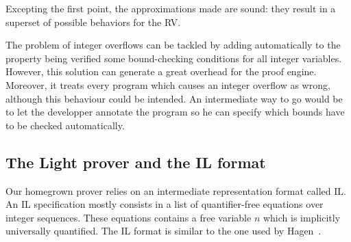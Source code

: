 Excepting the first point, the approximations made are sound: they result in a superset of possible behaviors for the RV. %

The problem of integer overflows can be tackled by adding automatically to the property being verified some bound-checking conditions for all integer variables. However, this solution can generate a great overhead for the proof engine. Moreover, it treats every program which causes an integer overflow as wrong, although this behaviour could be intended. An intermediate way to go would be to let the developper annotate the program so he can specify which bounds have to be checked automatically.

%




\subsection{The Light prover and the IL format} 

Our homegrown prover relies on an intermediate representation format called
{IL}. An IL specification mostly consists in a list of quantifier-free equations
over integer sequences. These equations contains a free variable $n$ which is
implicitly universally quantified. The IL format is similar to the one used by Hagen~\cite{HagenPhD}.


